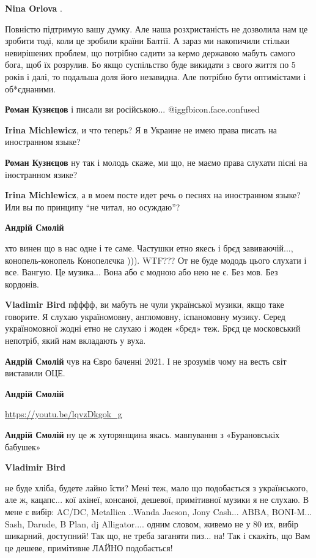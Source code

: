 \begin{itemize}
\begin{itemize}
\textbf{Nina Orlova} .

Повністю підтримую вашу думку. Але наша розхристаність не дозволила нам це
зробити тоді, коли це зробили країни Балтії. А зараз ми накопичили стільки
невирішених проблем, що потрібно садити за кермо державою мабуть самого бога, щоб
їх розрулив. Бо якщо суспільство буде викидати з свого життя по 5 років і
далі, то подальша доля його незавидна. Але потрібно бути оптимістами і
об*єднаними.

\textbf{Роман Кузнєцов} і писали ви російською... @igg{fbicon.face.confused} 

\textbf{Irina Michlewicz}, и что теперь? Я в Украине не имею права писать на иностранном языке?

\textbf{Роман Кузнєцов} ну так і молодь скаже, ми що, не маємо права слухати пісні на іностранном язике?

\textbf{Irina Michlewicz}, а в моем посте идет речь о песнях на иностранном языке? Или вы по принципу \enquote{не читал, но осуждаю}?
\end{itemize} %

\textbf{Андрій Смолій} 

хто винен що в нас одне і те саме. Частушки етно якесь і брєд завиваючій...,
конопель-конопель Конопелєчка ))). WTF??? От не буде мододь цього слухати і
все. Вангую. Це музика... Вона або є модною або нею не є. Без мов. Без кордонів.

\begin{itemize} %
\textbf{Vladimir Bird} пфффф, ви мабуть не чули української музики, якщо таке говорите.
Я слухаю україномовну, англомовну, іспаномовну музику. Серед україномовної жодні етно не слухаю і жоден «брєд» теж.
Брєд це московський непотріб, який нам вкладають у вуха.

\textbf{Андрій Смолій} чув на Євро баченні 2021. І не зрозумів чому на весть світ виставили ОЦЕ.

\textbf{Андрій Смолій} 

\url{https://youtu.be/lqvzDkgok_g}

\textbf{Андрій Смолій} ну це ж хуторянщина якась. мавпування з «Бурановськіх бабушек»

\textbf{Vladimir Bird} 

не буде хліба, будете лайно їсти? Мені теж, мало що подобається з українського,
але ж, кацапс... кої ахінеї, консаної, дешевої, примітивної музики я не слухаю.
В мене є вибір: AC/DC, Metallica ..Wanda Jacson, Jony Cash... ABBA,
BONI-M... Sash, Darude, B Plan, dj Alligator.... одним словом, живемо не у 80 их,
вибір шикарний, доступний! Так що, не треба заганяти пиз... на! Так і скажіть,
що Вам це дешеве, примітивне ЛАЙНО подобається!



\end{itemize}
\end{itemize}
